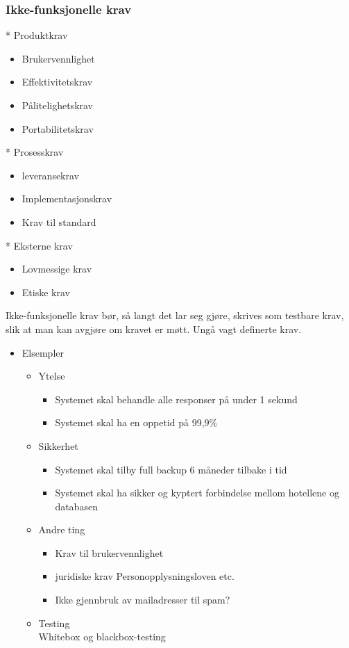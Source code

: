 \documentclass[11pt]{article}
\begin{document}
\subsubsection{Ikke-funksjonelle krav}
\label{sec-6.5.2}

    * Produktkrav
\begin{itemize}
\item Brukervennlighet
\item Effektivitetskrav
\item Pålitelighetskrav
\item Portabilitetskrav
\end{itemize}
    * Prosesskrav
\begin{itemize}
\item leveransekrav
\item Implementasjonskrav
\item Krav til standard
\end{itemize}
    * Eksterne krav
\begin{itemize}
\item Lovmessige krav
\item Etiske krav
\end{itemize}

    Ikke-funksjonelle krav bør, så langt det lar seg gjøre, skrives som testbare krav, slik at man kan avgjøre om kravet er møtt. Ungå vagt definerte krav.
\begin{itemize}

\item Elsempler
\label{sec-6.5.2.1}%
\begin{itemize}

\item Ytelse
\label{sec-6.5.2.1.1}%
\begin{itemize}
\item Systemet skal behandle alle responser på under 1 sekund
\item Systemet skal ha en oppetid på 99,9\%
\end{itemize}

\item Sikkerhet
\label{sec-6.5.2.1.2}%
\begin{itemize}
\item Systemet skal tilby full backup 6 måneder tilbake i tid
\item Systemet skal ha sikker og kyptert forbindelse mellom hotellene og databasen
\end{itemize}

\item Andre ting
\label{sec-6.5.2.1.3}%
\begin{itemize}
\item Krav til brukervennlighet
\item juridiske krav
        Personopplysningsloven etc.
\item Ikke gjennbruk av mailadresser til spam?
\end{itemize}

\item Testing\\
\label{sec-6.5.2.1.4}%
Whitebox og blackbox-testing

\end{itemize} %
\end{itemize} %
\end{document}
